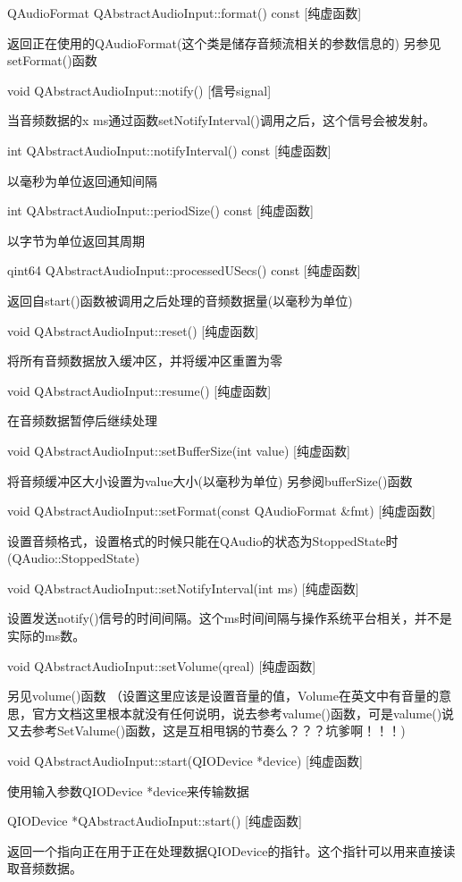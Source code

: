 QAudioFormat QAbstractAudioInput::format() const [纯虚函数]

返回正在使用的QAudioFormat(这个类是储存音频流相关的参数信息的) 另参见setFormat()函数

void QAbstractAudioInput::notify() [信号signal]

当音频数据的x ms通过函数setNotifyInterval()调用之后，这个信号会被发射。

int QAbstractAudioInput::notifyInterval() const [纯虚函数]

以毫秒为单位返回通知间隔

int QAbstractAudioInput::periodSize() const [纯虚函数]

以字节为单位返回其周期

qint64 QAbstractAudioInput::processedUSecs() const [纯虚函数]

返回自start()函数被调用之后处理的音频数据量(以毫秒为单位)

void QAbstractAudioInput::reset() [纯虚函数]

将所有音频数据放入缓冲区，并将缓冲区重置为零

void QAbstractAudioInput::resume() [纯虚函数]

在音频数据暂停后继续处理

void QAbstractAudioInput::setBufferSize(int value) [纯虚函数]

将音频缓冲区大小设置为value大小(以毫秒为单位) 另参阅bufferSize()函数

void QAbstractAudioInput::setFormat(const QAudioFormat \&fmt) [纯虚函数]

设置音频格式，设置格式的时候只能在QAudio的状态为StoppedState时(QAudio::StoppedState)

void QAbstractAudioInput::setNotifyInterval(int ms) [纯虚函数]

设置发送notify()信号的时间间隔。这个ms时间间隔与操作系统平台相关，并不是实际的ms数。

void QAbstractAudioInput::setVolume(qreal) [纯虚函数]

另见volume()函数 （设置这里应该是设置音量的值，Volume在英文中有音量的意思，官方文档这里根本就没有任何说明，说去参考valume()函数，可是valume()说又去参考SetValume()函数，这是互相甩锅的节奏么？？？坑爹啊！！！)

void QAbstractAudioInput::start(QIODevice *device) [纯虚函数]

使用输入参数QIODevice *device来传输数据

QIODevice *QAbstractAudioInput::start() [纯虚函数]

返回一个指向正在用于正在处理数据QIODevice的指针。这个指针可以用来直接读取音频数据。

